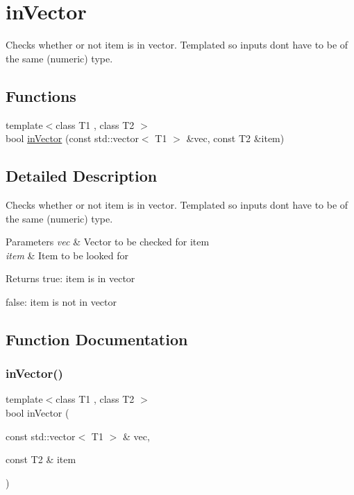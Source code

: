 \hypertarget{group__inVector}{}\section{in\+Vector}
\label{group__inVector}


Checks whether or not item is in vector. Templated so inputs don\textquotesingle{}t have to be of the same (numeric) type.  


\subsection*{Functions}
\begin{DoxyCompactItemize}
\item 
{\footnotesize template$<$class T1 , class T2 $>$ }\\bool \mbox{\hyperlink{group__inVector_gac757458344cbb085dcebd2d0c7b9639f}{in\+Vector}} (const std\+::vector$<$ T1 $>$ \&vec, const T2 \&item)
\end{DoxyCompactItemize}


\subsection{Detailed Description}
Checks whether or not item is in vector. Templated so inputs don\textquotesingle{}t have to be of the same (numeric) type. 


\begin{DoxyParams}{Parameters}
{\em vec} & Vector to be checked for item \\
\hline
{\em item} & Item to be looked for \\
\hline
\end{DoxyParams}
\begin{DoxyReturn}{Returns}
true\+: item is in vector 

false\+: item is not in vector 
\end{DoxyReturn}


\subsection{Function Documentation}
\mbox{\label{group__inVector_gac757458344cbb085dcebd2d0c7b9639f}} 
\subsubsection{\texorpdfstring{in\+Vector()}{inVector()}}
{\footnotesize\ttfamily template$<$class T1 , class T2 $>$ \\
bool in\+Vector (\begin{DoxyParamCaption}\item[{const std\+::vector$<$ T1 $>$ \&}]{vec,  }\item[{const T2 \&}]{item }\end{DoxyParamCaption})}

